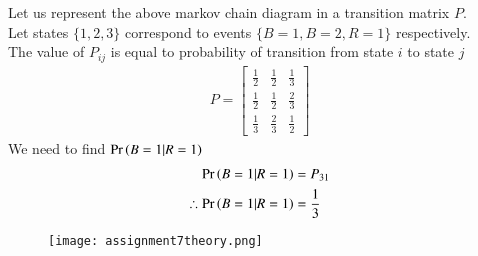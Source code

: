 \documentclass[journal,12pt,twocolumn]{IEEEtran}
\begin{document}
Let us represent the above markov chain diagram in a transition matrix $P$.\\
Let states $\{1,2,3\}$ correspond to events $\{B=1,B=2,R=1\}$ respectively.\\
The value of $P_{ij}$ is equal to probability of transition from state $i$ to state $j$
\begin{align}
P=\begin{bmatrix}
\frac{1}{2}&\frac{1}{2}&\frac{1}{3}\\
\frac{1}{2}&\frac{1}{2}&\frac{2}{3}\\
\frac{1}{3}&\frac{2}{3}&\frac{1}{2}
\end{bmatrix} \label{matrix}
\end{align}
 We need to find $\Pr\left(B=1|R=1\right)$
\begin{align}
  \Pr\left(B=1|R=1\right)&=P_{31} \label{31}\\
 \therefore \Pr\left(B=1|R=1\right)&=\frac{1}{3}
\end{align}  
 
\begin{figure}[htb!]
\begin{center}
\texttt{[image: assignment7theory.png]}
\end{center}
\end{figure}
\end{document}
